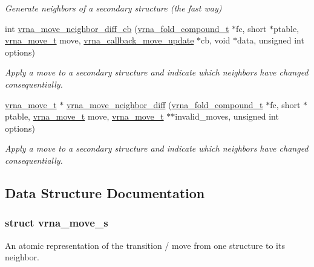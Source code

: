 \begin{DoxyCompactItemize}
\begin{DoxyCompactList}\small\item\em Generate neighbors of a secondary structure (the fast way) \end{DoxyCompactList}\item 
int \mbox{\hyperlink{group__neighbors_gad495362605ffd0168591ce41a685ee3e}{vrna\+\_\+move\+\_\+neighbor\+\_\+diff\+\_\+cb}} (\mbox{\hyperlink{group__fold__compound_ga1b0cef17fd40466cef5968eaeeff6166}{vrna\+\_\+fold\+\_\+compound\+\_\+t}} $\ast$fc, short $\ast$ptable, \mbox{\hyperlink{group__neighbors_ga08630e00206cd163ea29c462bf5f4755}{vrna\+\_\+move\+\_\+t}} move, \mbox{\hyperlink{group__neighbors_ga4605019694e3d38e2c40d5a97ef99920}{vrna\+\_\+callback\+\_\+move\+\_\+update}} $\ast$cb, void $\ast$data, unsigned int options)
\begin{DoxyCompactList}\small\item\em Apply a move to a secondary structure and indicate which neighbors have changed consequentially. \end{DoxyCompactList}\item 
\mbox{\hyperlink{group__neighbors_ga08630e00206cd163ea29c462bf5f4755}{vrna\+\_\+move\+\_\+t}} $\ast$ \mbox{\hyperlink{group__neighbors_gaa3e8c627d24912974922c5ae805e15e0}{vrna\+\_\+move\+\_\+neighbor\+\_\+diff}} (\mbox{\hyperlink{group__fold__compound_ga1b0cef17fd40466cef5968eaeeff6166}{vrna\+\_\+fold\+\_\+compound\+\_\+t}} $\ast$fc, short $\ast$ptable, \mbox{\hyperlink{group__neighbors_ga08630e00206cd163ea29c462bf5f4755}{vrna\+\_\+move\+\_\+t}} move, \mbox{\hyperlink{group__neighbors_ga08630e00206cd163ea29c462bf5f4755}{vrna\+\_\+move\+\_\+t}} $\ast$$\ast$invalid\+\_\+moves, unsigned int options)
\begin{DoxyCompactList}\small\item\em Apply a move to a secondary structure and indicate which neighbors have changed consequentially. \end{DoxyCompactList}\end{DoxyCompactItemize}


\subsection{Data Structure Documentation}
\label{structvrna__move__s}
\subsubsection{struct vrna\+\_\+move\+\_\+s}
An atomic representation of the transition / move from one structure to its neighbor. 

